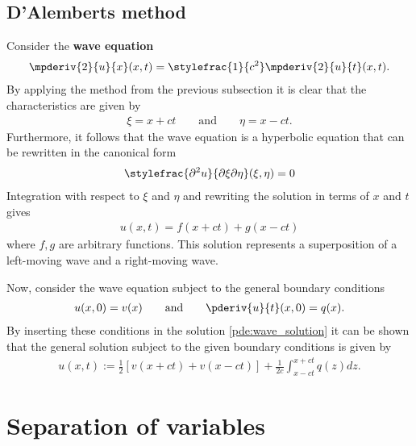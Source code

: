 \subsection{D'Alemberts method}

    Consider the \textbf{wave equation}
    \begin{gather}
        \label{pde:wave_equation}
        \mpderiv{2}{u}{x}(x,t) = \stylefrac{1}{c^2}\mpderiv{2}{u}{t}(x,t).
    \end{gather}
    By applying the method from the previous subsection it is clear that the characteristics are given by
    \begin{gather}
        \xi = x + ct\qquad\text{and}\qquad \eta = x - ct.
    \end{gather}
    Furthermore, it follows that the wave equation is a hyperbolic equation that can be rewritten in the canonical form
    \begin{gather}
        \label{pde:canonical_wave_equation}
        \stylefrac{\partial^2u}{\partial\xi\partial\eta}(\xi,\eta) = 0
    \end{gather}
    Integration with respect to $\xi$ and $\eta$ and rewriting the solution in terms of $x$ and $t$ gives
    \begin{gather}
        \label{pde:wave_solution}
        u(x,t) = f(x+ct) + g(x-ct)
    \end{gather}
    where $f,g$ are arbitrary functions. This solution represents a superposition of a left-moving wave and a right-moving wave.

    Now, consider the wave equation subject to the general boundary conditions
    \begin{gather}
        u(x,0) = v(x)\qquad\text{and}\qquad \pderiv{u}{t}(x,0) = q(x).
    \end{gather}
    By inserting these conditions in the solution \eqref{pde:wave_solution} it can be shown that the general solution subject to the given boundary conditions is given by
    \begin{gather}
        \label{pde:dalembert_solution}
        u(x,t) := \frac{1}{2}\left[v(x+ct) + v(x-ct)\right] + \frac{1}{2c}\int_{x-ct}^{x+ct}q(z)dz.
    \end{gather}

\section{Separation of variables}\label{section:separation_of_variables}


